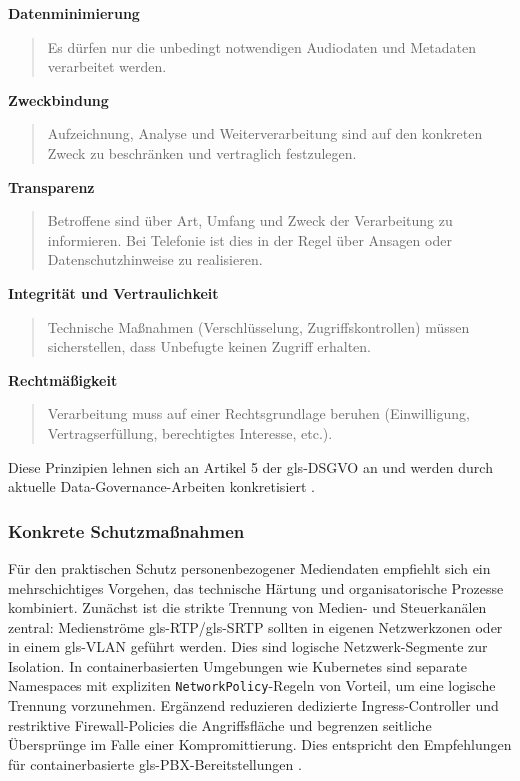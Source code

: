\noindent\textbf{Datenminimierung}
\begin{quote}
Es dürfen nur die unbedingt notwendigen Audiodaten und Metadaten verarbeitet werden.
\end{quote}
\noindent\textbf{Zweckbindung}
\begin{quote}
Aufzeichnung, Analyse und
Weiterverarbeitung sind auf den konkreten Zweck zu beschränken und vertraglich festzulegen.
\end{quote}

\noindent\textbf{Transparenz}
\begin{quote}
Betroffene sind über Art, Umfang und
Zweck der Verarbeitung zu informieren. Bei Telefonie ist dies in der Regel über Ansagen oder Datenschutzhinweise zu realisieren.
\end{quote}
\clearpage
\noindent\textbf{Integrität und Vertraulichkeit}
\begin{quote}
Technische Ma\ss nahmen (Verschlüsselung,
Zugriffskontrollen) müssen sicherstellen, dass Unbefugte keinen Zugriff erhalten.
\end{quote}

\noindent\textbf{Rechtmä\ss igkeit}
\begin{quote}
Verarbeitung muss auf einer Rechtsgrundlage beruhen (Einwilligung, Vertragserfüllung, berechtigtes Interesse, etc.).
\end{quote}

Diese Prinzipien lehnen sich an Artikel 5 der \gls{gls-DSGVO} an und werden durch aktuelle Data-Governance-Arbeiten konkretisiert \parencite{Data2025_AIDataQuality}.

\subsubsection{Konkrete Schutzma\ss nahmen}

Für den praktischen Schutz personenbezogener Mediendaten empfiehlt sich ein mehrschichtiges Vorgehen, das technische Härtung und organisatorische Prozesse kombiniert. Zunächst ist die strikte Trennung von Medien- und
Steuerkanälen zentral: Medienströme \gls{gls-RTP}/\gls{gls-SRTP} sollten in eigenen Netzwerkzonen oder in einem \gls{gls-VLAN} geführt werden. Dies sind logische Netzwerk-Segmente zur Isolation. In containerbasierten Umgebungen wie Kubernetes sind separate Namespaces mit expliziten \texttt{NetworkPolicy}-Regeln von Vorteil, um eine logische Trennung vorzunehmen. Ergänzend reduzieren dedizierte Ingress-Controller und restriktive Firewall-Policies die Angriffsfläche und begrenzen seitliche Übersprünge im Falle einer Kompromittierung. Dies entspricht den Empfehlungen für containerbasierte \gls{gls-PBX}-Bereitstellungen \parencite{Antonova2025}.

